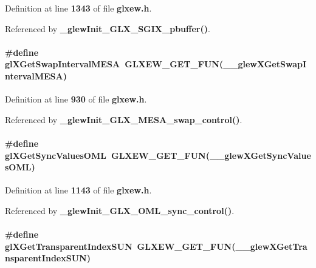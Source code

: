 Definition at line {\bf 1343} of file {\bf glxew.\+h}.



Referenced by {\bf \+\_\+glew\+Init\+\_\+\+G\+L\+X\+\_\+\+S\+G\+I\+X\+\_\+pbuffer()}.

\paragraph[{gl\+X\+Get\+Swap\+Interval\+M\+E\+SA}]{\setlength{\rightskip}{0pt plus 5cm}\#define gl\+X\+Get\+Swap\+Interval\+M\+E\+SA~{\bf G\+L\+X\+E\+W\+\_\+\+G\+E\+T\+\_\+\+F\+UN}({\bf \+\_\+\+\_\+glew\+X\+Get\+Swap\+Interval\+M\+E\+SA})}\label{glxew_8h_ae26304bd595cbf68115c4fd1e3c18d32}


Definition at line {\bf 930} of file {\bf glxew.\+h}.



Referenced by {\bf \+\_\+glew\+Init\+\_\+\+G\+L\+X\+\_\+\+M\+E\+S\+A\+\_\+swap\+\_\+control()}.

\paragraph[{gl\+X\+Get\+Sync\+Values\+O\+ML}]{\setlength{\rightskip}{0pt plus 5cm}\#define gl\+X\+Get\+Sync\+Values\+O\+ML~{\bf G\+L\+X\+E\+W\+\_\+\+G\+E\+T\+\_\+\+F\+UN}({\bf \+\_\+\+\_\+glew\+X\+Get\+Sync\+Values\+O\+ML})}\label{glxew_8h_a8c81a413bcfb6441ef818c3399d0e325}


Definition at line {\bf 1143} of file {\bf glxew.\+h}.



Referenced by {\bf \+\_\+glew\+Init\+\_\+\+G\+L\+X\+\_\+\+O\+M\+L\+\_\+sync\+\_\+control()}.

\paragraph[{gl\+X\+Get\+Transparent\+Index\+S\+UN}]{\setlength{\rightskip}{0pt plus 5cm}\#define gl\+X\+Get\+Transparent\+Index\+S\+UN~{\bf G\+L\+X\+E\+W\+\_\+\+G\+E\+T\+\_\+\+F\+UN}({\bf \+\_\+\+\_\+glew\+X\+Get\+Transparent\+Index\+S\+UN})}\label{glxew_8h_a3fd89aa6c6dbef83ceb2fdfd5b759e2c}


